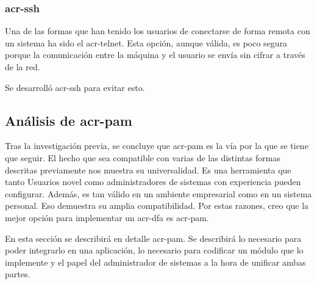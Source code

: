 \documentclass[titlepage, 12pt, a4paper]{article}
\begin{document}
\subsubsection{\gls{acr-ssh}}
Una de las formas que han tenido los usuarios de conectarse de forma remota con un sistema ha sido el \gls{acr-telnet}. Esta opción, aunque válida, es poco segura porque la comunicación entre la máquina y el usuario se envía sin cifrar a través de la red.\par Se desarrolló \gls{acr-ssh} para evitar esto.
\subsection{Análisis de \gls{acr-pam}}
Tras la investigación previa, se concluye que \gls{acr-pam} es la vía por la que se tiene que seguir. El hecho que sea compatible con varias de las distintas formas descritas previamente nos muestra su universalidad. Es una herramienta que tanto Usuarios novel como administradores de sistemas con experiencia pueden configurar. Además, es tan válido en un ambiente empresarial como en un sistema personal. Eso demuestra su amplia compatibilidad. Por estas razones, creo que la mejor opción para implementar un \gls{acr-dfa} es \gls{acr-pam}.\par
En esta sección se describirá en detalle \gls{acr-pam}. Se describirá lo necesario para poder integrarlo en una aplicación, lo necesario para codificar un módulo que lo implemente y el papel del administrador de sistemas a la hora de unificar ambas partes.
\end{document}
